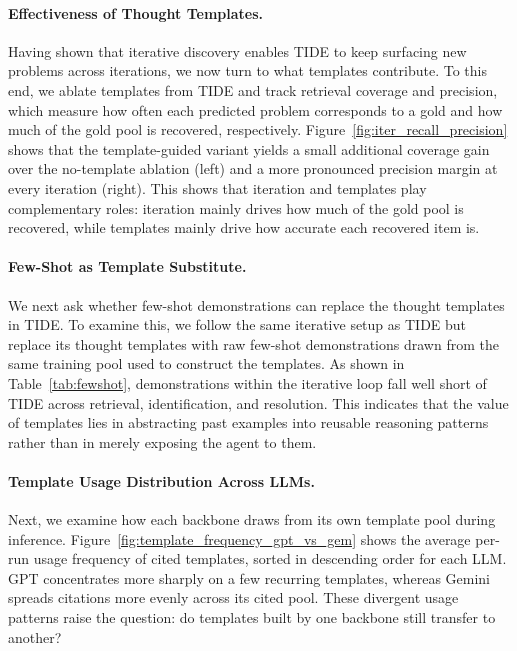 \paragraph{Effectiveness of Thought Templates.}
Having shown that iterative discovery enables \textsc{TIDE} to keep surfacing new problems across iterations, we now turn to what templates contribute.
To this end, we ablate templates from \textsc{TIDE} and track retrieval coverage and precision, which measure how often each predicted problem corresponds to a gold and how much of the gold pool is recovered, respectively.
Figure~\ref{fig:iter_recall_precision} shows that the template-guided variant yields a small additional coverage gain over the no-template ablation (left) and a more pronounced precision margin at every iteration (right).
This shows that iteration and templates play complementary roles: iteration mainly drives how much of the gold pool is recovered, while templates mainly drive how accurate each recovered item is.

\paragraph{Few-Shot as Template Substitute.}
We next ask whether few-shot demonstrations can replace the thought templates in \textsc{TIDE}.
To examine this, we follow the same iterative setup as \textsc{TIDE} but replace its thought templates with raw few-shot demonstrations drawn from the same training pool used to construct the templates.
As shown in Table~\ref{tab:fewshot}, demonstrations within the iterative loop fall well short of \textsc{TIDE} across retrieval, identification, and resolution.
This indicates that the value of templates lies in abstracting past examples into reusable reasoning patterns rather than in merely exposing the agent to them.

\paragraph{Template Usage Distribution Across LLMs.}
Next, we examine how each backbone draws from its own template pool during inference.
Figure~\ref{fig:template_frequency_gpt_vs_gem} shows the average per-run usage frequency of cited templates, sorted in descending order for each LLM.
GPT concentrates more sharply on a few recurring templates, whereas Gemini spreads citations more evenly across its cited pool.
These divergent usage patterns raise the question: do templates built by one backbone still transfer to another?

